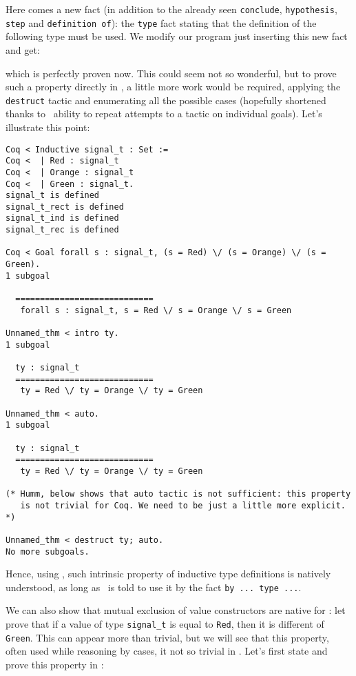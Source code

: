 \documentclass[11pt,a4paper,twoside,onecolumn,fullpage]{article}
\begin{document}
Here comes a new fact  (in addition to the already seen \lstinline"conclude",
\lstinline"hypothesis", \lstinline"step" and \lstinline"definition of"): the
\lstinline"type" fact stating that the definition of the following
type must be used. We modify our program just inserting this new fact
and get:

{\scriptsize
}

\noindent which is perfectly proven now. This could seem not so
wonderful, but to prove such a property directly in \coq, a little more
work would be required, applying the \verb"destruct" tactic and
enumerating all the possible cases (hopefully shortened thanks to
\coq\ ability to repeat attempts to a tactic on individual
goals). Let's illustrate this point:

{\scriptsize
\begin{lstlisting}[language=MyCoq]
Coq < Inductive signal_t : Set :=
Coq <  | Red : signal_t
Coq <  | Orange : signal_t
Coq <  | Green : signal_t.
signal_t is defined
signal_t_rect is defined
signal_t_ind is defined
signal_t_rec is defined

Coq < Goal forall s : signal_t, (s = Red) \/ (s = Orange) \/ (s = Green).
1 subgoal
  
  ============================
   forall s : signal_t, s = Red \/ s = Orange \/ s = Green

Unnamed_thm < intro ty.
1 subgoal
  
  ty : signal_t
  ============================
   ty = Red \/ ty = Orange \/ ty = Green

Unnamed_thm < auto.
1 subgoal
  
  ty : signal_t
  ============================
   ty = Red \/ ty = Orange \/ ty = Green

(* Humm, below shows that auto tactic is not sufficient: this property
   is not trivial for Coq. We need to be just a little more explicit. *)

Unnamed_thm < destruct ty; auto.
No more subgoals.
\end{lstlisting}}

Hence, using \zenon, such intrinsic property of inductive type
definitions is natively understood, as long as \zenon\ is told to use
it by the fact \lstinline"by ... type ...".

\medskip
We can also show that mutual exclusion of value constructors are
native for \zenon: let prove that if a value of type
\lstinline"signal_t" is equal to \lstinline"Red", then it is different
of \lstinline"Green". This can appear more than trivial, but we will
see that this property, often used while reasoning by cases, it not so
trivial in \coq. Let's first state and prove this property in \focal:
\end{document}
